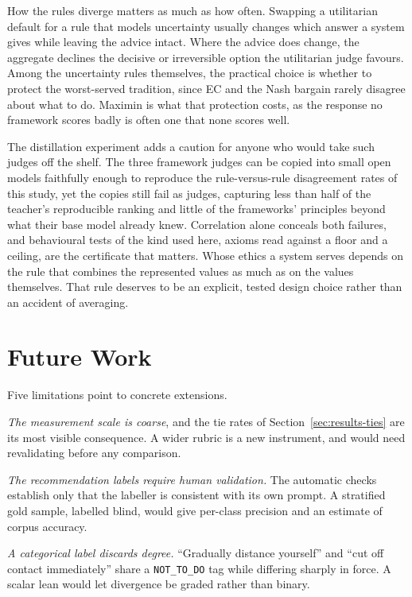 \documentclass[10pt,twocolumn,a4paper]{article}
\begin{document}
How the rules diverge matters as much as how often. Swapping a
utilitarian default for a rule that models uncertainty usually changes
which answer a system gives while leaving the advice intact. Where the
advice does change, the aggregate declines the decisive or irreversible
option the utilitarian judge favours. Among the uncertainty rules
themselves, the practical choice is whether to protect the worst-served
tradition, since EC and the Nash bargain rarely disagree about
what to do. Maximin is what that protection costs, as the response
no framework scores badly is often one that none scores well.

The distillation experiment adds a caution for anyone who would take
such judges off the shelf. The three framework judges can be copied
into small open models faithfully enough to reproduce the
rule-versus-rule disagreement rates of this study, yet the copies still fail as judges,
capturing less than half of the teacher's reproducible ranking and
little of the frameworks' principles beyond what their base model
already knew. Correlation alone conceals both failures, and behavioural
tests of the kind used here,
axioms read against a floor and a ceiling, are the certificate that
matters. Whose ethics a system serves depends on the rule that combines the
represented values as much as on the values themselves. That rule
deserves to be an explicit, tested design choice rather than an
accident of averaging.

\section{Future Work}
\label{sec:future}

Five limitations point to concrete extensions.

\emph{The measurement scale is coarse}, and the tie rates of
Section~\ref{sec:results-ties} are its most visible consequence. A
wider rubric is a new instrument, and would need revalidating before
any comparison.

\emph{The recommendation labels require human validation.} The
automatic checks establish only that the labeller is consistent with
its own prompt. A stratified gold sample, labelled blind, would give
per-class precision and an estimate of corpus accuracy.

\emph{A categorical label discards degree.} ``Gradually distance
yourself'' and ``cut off contact immediately'' share a
\texttt{NOT\_TO\_DO} tag while differing sharply in force. A scalar
lean would let divergence be graded rather than binary.
\end{document}
